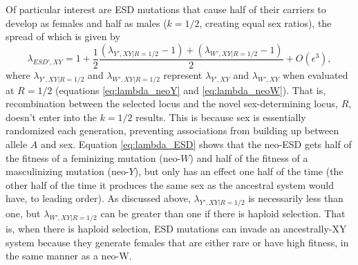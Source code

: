 \documentclass[12pt]{article}
\begin{document}
Of particular interest are ESD mutations that cause half of their carriers to develop as females and half as males ($k=1/2$, creating equal sex ratios), the spread of which is given by
\begin{equation}
\lambda_{ESD',XY} =1+ \frac{1}{2}\frac{(\lambda_{Y',XY\rvert R=1/2}-1) + (\lambda_{W',XY\rvert R=1/2}-1)}{2} + O\left(\epsilon^3\right),
\label{eq:lambda_ESD}
\end{equation}
\noindent
where $\lambda_{Y',XY\rvert R=1/2}$ and $\lambda_{W',XY\rvert R=1/2}$ represent $\lambda_{Y',XY}$ and $\lambda_{W',XY}$ when evaluated at $R=1/2$ (equations \ref{eq:lambda_neoY} and \ref{eq:lambda_neoW}).
That is, recombination between the selected locus and the novel sex-determining locus, $R$, doesn't enter into the $k=1/2$ results.
This is because sex is essentially randomized each generation, %
preventing associations from building up between allele $A$ and sex. 
Equation \eqref{eq:lambda_ESD} shows that the neo-ESD gets half of the fitness of a feminizing mutation (neo-$W$) and half of the fitness of a masculinizing mutation (neo-$Y$), but only has an effect one half of the time (the other half of the time it produces the same sex as the ancestral system would have, to leading order). 
As discussed above, $\lambda_{Y',XY\rvert R=1/2}$ is necessarily less than one, but $\lambda_{W',XY\rvert R=1/2}$ can be greater than one if there is haploid selection.
That is, when there is haploid selection, ESD mutations can invade an ancestrally-XY system because they generate females that are either rare or have high fitness, in the same manner as a neo-W. 
\end{document}
